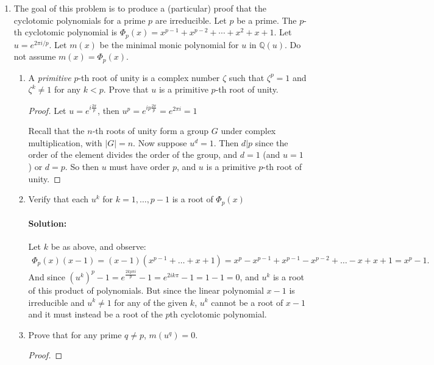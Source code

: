 \documentclass{article}
\begin{document}
    \begin{enumerate}
\item The goal of this problem is to produce a (particular) proof that the cyclotomic polynomials for a prime $p$ are irreducible.   Let $p$ be a prime.  The $p$-th cyclotomic polynomial is $\Phi_p(x)=x^{p-1}+x^{p-2}+\cdots +x^2+x+1$.  Let $u=e^{2\pi i/p}$.  Let $m(x)$ be the minimal monic polynomial for $u$ in ${\mathbb Q}(u)$.  Do not assume $m(x)=\Phi_p(x)$.

\begin{enumerate}
\item A {\it primitive} $p$-th root of unity is a complex number $\zeta$ such that $\zeta^p=1$ and $\zeta^k\neq 1$ for any $k<p$.  Prove that $u$ is a primitive $p$-th root of unity.
    \begin{proof} 
        Let $u=e^{i \frac{2\pi}{p}}$, then $u^{p}=e^{ip \frac{2\pi}{p}}=e^{2\pi i}=1$

        Recall that the $n$-th roots of unity form a group $G$ under complex multiplication, with $|G|=n$.
        Now suppose $u^{d}=1$. Then $d|p$ since the order of the element divides the order of the group,
        and $d=1$ (and $u=1$) or $d=p$. So then $u$ must have order $p$, and $u$ is a primitive $p$-th 
        root of unity.
    \end{proof}
\item Verify that each $u^k$ for $k=1, \ldots , p-1$ is a root of $\Phi_p(x)$
    \paragraph{Solution:} 
    Let $k$ be as above, and observe:
    \begin{align*}
        \Phi_p(x)(x-1)=(x-1)(x^{p-1}+\ldots+x+1)=x^{p}-x^{p-1}+x^{p-1}-x^{p-2}+\ldots-x+x+1=x^{p}-1
    .\end{align*}
    And since $(u^{k})^{p}-1=e^{\frac{2kp\pi i}{p}}-1=e^{2ik\pi}-1=1-1=0$, and $u^{k}$ is a root of this 
    product of polynomials. But since the linear polynomial $x-1$ is irreducible and $u^k\neq 1$ 
    for any of the given $k$, $u^{k}$ cannot be a root of $x-1$ and it must instead be a root of the 
    $p$th cyclotomic polynomial.

\item Prove that for any prime $q\neq p$, $m(u^q)=0$.

     \begin{proof} 
         \iffalse
        Let $q\neq p$. Write $q=np+r$ with $1\leq r < p$ by Quotient-Remainder Theorem ($r\neq 1$ since
        $q,p$ are distinct primes). Then:
        \[
            u^q=e^{\frac{2i\pi q}{p}}=e^{\frac{2i\pi(np+r) }{p}}=e^{2\pi i n}\cdot e^{\frac{2\pi i r}{p}}
            =1\cdot u^{r}
        .\] 
        And then by (b), $\Phi_p(u^{q})=0$
    \fi
    \end{proof}


\end{enumerate}
\end{enumerate}
\end{document}
